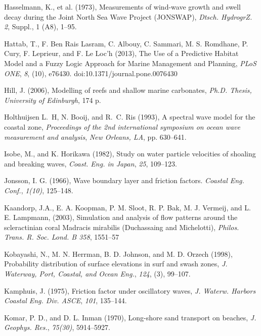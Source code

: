 \documentclass[default,jgrga]{agutex2015}
\begin{document}
\begin{article}
\begin{thebibliography}{}
Hasselmann, K., et al. (1973), Measurements of wind-wave growth and swell decay during the Joint North Sea Wave Project (JONSWAP), \textit{Dtsch. HydrogrZ. 2}, Suppl., 1 (A8), 1--95.

Hattab, T., F. Ben Rais Lasram, C. Albouy, C. Sammari, M. S. Romdhane, P. Cury, F. Leprieur, and F. Le Loc'h (2013), The Use of a Predictive Habitat Model and a Fuzzy Logic Approach for Marine Management and Planning, \textit{PLoS ONE}, \textit{8}, (10), e76430. doi:10.1371/journal.pone.0076430

Hill, J. (2006), Modelling of reefs and shallow marine carbonates, \textit{Ph.D. Thesis, University of Edinburgh}, 174 p.

Holthuijsen L.~H, N. Booij, and R.~C. Ris (1993), A spectral wave model for the coastal zone, \textit{Proceedings of the 2nd international symposium on ocean wave measurement and analysis}, \textit{New Orleans, LA}, pp. 630--641.

Isobe, M., and K. Horikawa (1982), Study on water particle velocities of shoaling and breaking waves,  \textit{Coast. Eng. in Japan},  \textit{25}, 109--123.

Jonsson, I. G. (1966), Wave boundary layer and friction factors. \textit{Coastal Eng. Conf.}, \textit{1(10)}, 125--148.

Kaandorp, J.A., E. A. Koopman, P. M. Sloot, R. P. Bak, M. J. Vermeij, and L. E. Lampmann, (2003), Simulation and analysis of flow patterns around the scleractinian coral Madracis mirabilis (Duchassaing and Michelotti), \textit{Philos. Trans. R. Soc. Lond. B 358}, 1551--57

Kobayashi, N., M. N. Herrman, B. D. Johnson, and M. D. Orzech (1998), Probability distribution of surface elevations in surf and swash zones, \textit{J. Waterway, Port, Coastal, and Ocean Eng.}, \textit{124}, (3), 99--107.

Kamphuis, J. (1975), Friction factor under oscillatory waves, \textit{J. Waterw. Harbors Coastal Eng. Div. ASCE}, \textit{101}, 135--144.

Komar, P. D., and D. L. Inman (1970), Long-shore sand transport on beaches, \textit{J. Geophys. Res.}, \textit{75(30)}, 5914--5927.


\end{thebibliography}
\end{article}
\end{document}
